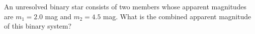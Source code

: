 An unresolved binary star consists of two members whose apparent magnitudes are $m_1=2.0$ mag and
$m_2=4.5$ mag. What is the combined apparent magnitude of this binary system?

